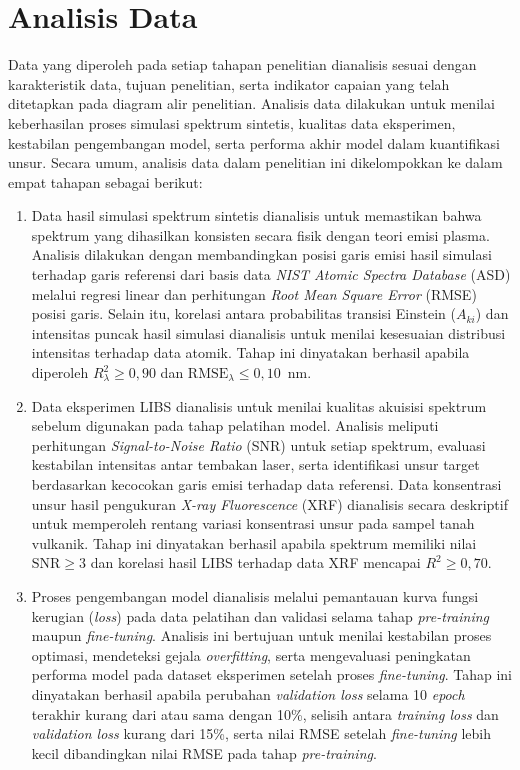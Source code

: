 \section{Analisis Data}
Data yang diperoleh pada setiap tahapan penelitian dianalisis sesuai dengan karakteristik data, tujuan penelitian, serta indikator capaian yang telah ditetapkan pada diagram alir penelitian. Analisis data dilakukan untuk menilai keberhasilan proses simulasi spektrum sintetis, kualitas data eksperimen, kestabilan pengembangan model, serta performa akhir model dalam kuantifikasi unsur. Secara umum, analisis data dalam penelitian ini dikelompokkan ke dalam empat tahapan sebagai berikut:
\begin{enumerate}
    \item Data hasil simulasi spektrum sintetis dianalisis untuk memastikan bahwa spektrum yang dihasilkan konsisten secara fisik dengan teori emisi plasma. Analisis dilakukan dengan membandingkan posisi garis emisi hasil simulasi terhadap garis referensi dari basis data \textit{NIST Atomic Spectra Database} (ASD) melalui regresi linear dan perhitungan \textit{Root Mean Square Error} (RMSE) posisi garis. Selain itu, korelasi antara probabilitas transisi Einstein ($A_{ki}$) dan intensitas puncak hasil simulasi dianalisis untuk menilai kesesuaian distribusi intensitas terhadap data atomik. Tahap ini dinyatakan berhasil apabila diperoleh $R^2_{\lambda} \geq 0{,}90$ dan $\mathrm{RMSE}_{\lambda} \leq 0{,}10$~nm.

    \item Data eksperimen LIBS dianalisis untuk menilai kualitas akuisisi spektrum sebelum digunakan pada tahap pelatihan model. Analisis meliputi perhitungan \textit{Signal-to-Noise Ratio} (SNR) untuk setiap spektrum, evaluasi kestabilan intensitas antar tembakan laser, serta identifikasi unsur target berdasarkan kecocokan garis emisi terhadap data referensi. Data konsentrasi unsur hasil pengukuran \textit{X-ray Fluorescence} (XRF) dianalisis secara deskriptif untuk memperoleh rentang variasi konsentrasi unsur pada sampel tanah vulkanik. Tahap ini dinyatakan berhasil apabila spektrum memiliki nilai $\mathrm{SNR} \geq 3$ dan korelasi hasil LIBS terhadap data XRF mencapai $R^2 \geq 0{,}70$.

    \item Proses pengembangan model dianalisis melalui pemantauan kurva fungsi kerugian (\textit{loss}) pada data pelatihan dan validasi selama tahap \textit{pre-training} maupun \textit{fine-tuning}. Analisis ini bertujuan untuk menilai kestabilan proses optimasi, mendeteksi gejala \textit{overfitting}, serta mengevaluasi peningkatan performa model pada dataset eksperimen setelah proses \textit{fine-tuning}. Tahap ini dinyatakan berhasil apabila perubahan \textit{validation loss} selama 10 \textit{epoch} terakhir kurang dari atau sama dengan 10\%, selisih antara \textit{training loss} dan \textit{validation loss} kurang dari 15\%, serta nilai RMSE setelah \textit{fine-tuning} lebih kecil dibandingkan nilai RMSE pada tahap \textit{pre-training}.


\end{enumerate}
